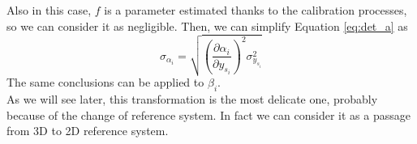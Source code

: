 Also in this case, $f$ is a parameter estimated thanks to the calibration processes, so we can consider it as negligible. Then, we can simplify Equation \ref{eq:det_a} as
  \begin{equation*}
  	\sigma_{\alpha_i} = \sqrt{
  	  \left( \frac{\partial \alpha_i}{\partial y_{s_i}} \right)^2 \sigma_{y_{s_i}}^2
  	}
  \end{equation*}
The same conclusions can be applied to $\beta_i$. \\

As we will see later, this transformation is the most delicate one, probably because of the change of reference system. In fact we can consider it as a passage from 3D to 2D reference system.
